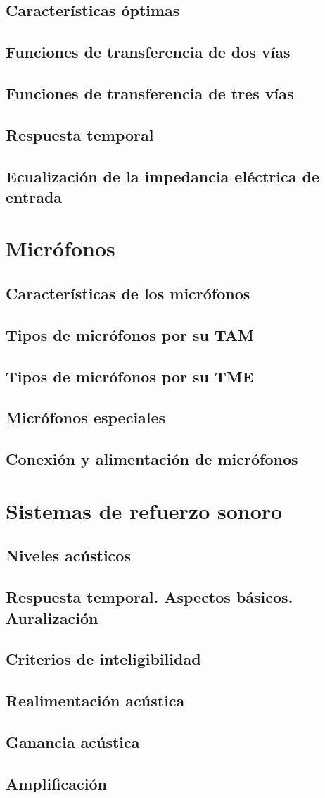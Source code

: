 \documentclass[10pt]{book}
\begin{document}
\section{Características óptimas}
\section{Funciones de transferencia de dos vías}
\section{Funciones de transferencia de tres vías}
\section{Respuesta temporal}
\section{Ecualización de la impedancia eléctrica de entrada}

\chapter{Micrófonos}
\section{Características de los micrófonos}
\section{Tipos de micrófonos por su TAM}
\section{Tipos de micrófonos por su TME}
\section{Micrófonos especiales}
\section{Conexión y alimentación de micrófonos}

\chapter{Sistemas de refuerzo sonoro}
\section{Niveles acústicos}
\section{Respuesta temporal. Aspectos básicos. Auralización}
\section{Criterios de inteligibilidad}
\section{Realimentación acústica}
\section{Ganancia acústica}
\section{Amplificación}
\end{document}

